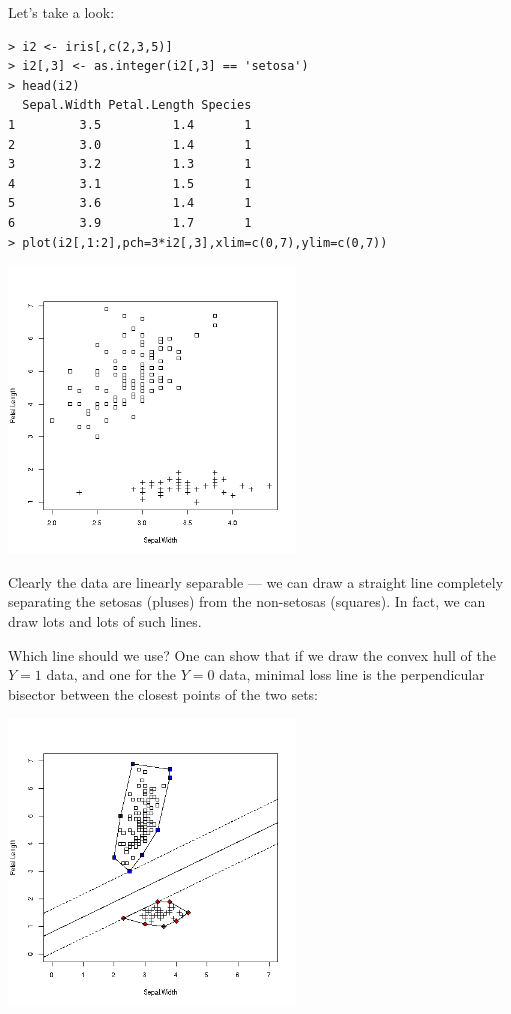 Let's take a look:

\begin{lstlisting}
> i2 <- iris[,c(2,3,5)]
> i2[,3] <- as.integer(i2[,3] == 'setosa')
> head(i2)
  Sepal.Width Petal.Length Species
1         3.5          1.4       1
2         3.0          1.4       1
3         3.2          1.3       1
4         3.1          1.5       1
5         3.6          1.4       1
6         3.9          1.7       1
> plot(i2[,1:2],pch=3*i2[,3],xlim=c(0,7),ylim=c(0,7))
\end{lstlisting}

\includegraphics[width=3in]{IrisOrigNew.png}

Clearly the data are linearly separable --- we can draw a straight line
completely separating the setosas (pluses) from the non-setosas
(squares).  In fact, we can draw lots and lots of such lines.

Which line should we use?  One can show that if we draw the convex hull
of the $Y = 1$ data, and one for the $Y = 0$ data, minimal loss line is
the perpendicular bisector between the closest points of the two sets:

\includegraphics[width=3in]{IrisConvNew.png}

